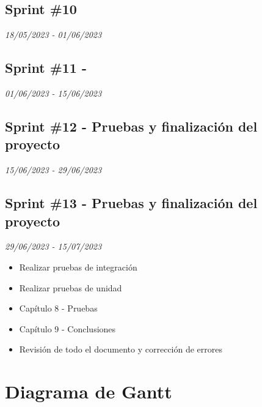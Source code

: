 \subsection{Sprint \#10}
\textit{18/05/2023   -   01/06/2023}


\subsection{Sprint \#11 - }
\textit{01/06/2023   -   15/06/2023}


\subsection{Sprint \#12 - Pruebas y finalización del proyecto}
\textit{15/06/2023   -   29/06/2023}


\subsection{Sprint \#13 - Pruebas y finalización del proyecto}
\textit{29/06/2023   -   15/07/2023}
\begin{itemize}
    \item Realizar pruebas de integración
    \item Realizar pruebas de unidad
    \item Capítulo 8 - Pruebas
    \item Capítulo 9 - Conclusiones
    \item Revisión de todo el documento y corrección de errores
\end{itemize}



\section{Diagrama de Gantt}